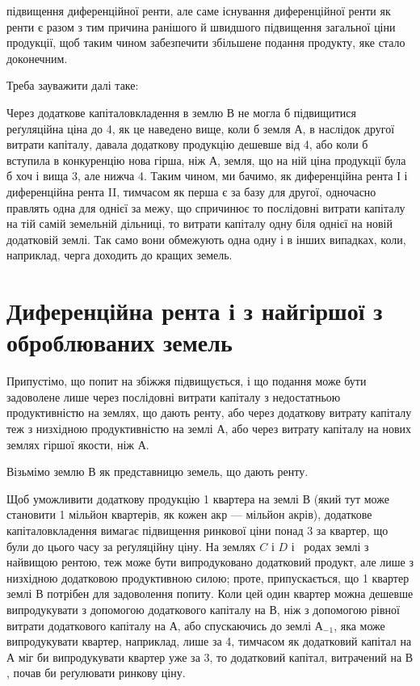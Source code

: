 \parcont{}  %
підвищення диференційної ренти, але саме існування диференційної ренти як
ренти є разом з тим причина ранішого й швидшого підвищення загальної ціни
продукції, щоб таким чином забезпечити збільшене подання продукту, яке стало доконечним.

Треба зауважити далі таке:

Через додаткове капіталовкладення в землю $В$ не могла б підвищитися
реґуляційна ціна до 4, як це наведено вище, коли б земля $А$, в наслідок
другої витрати капіталу, давала додаткову продукцію дешевше від 4, або коли б вступила в конкуренцію нова гірша, ніж $А$, земля, що на
ній ціна продукції була б хоч і вища 3, але нижча 4. Таким чином,
ми бачимо, як диференційна рента І і диференційна рента II, тимчасом як
перша є за базу для другої, одночасно правлять одна для однієї за межу, що
спричинює то послідовні витрати капіталу на тій самій земельній дільниці, то
витрати капіталу одну біля однієї на новій додатковій землі. Так само вони
обмежують одна одну і в інших випадках, коли, наприклад, черга доходить до
кращих земель.

\section{Диференційна рента і з найгіршої з оброблюваних земель}

Припустімо, що попит на збіжжя підвищується, і що подання може бути
задоволене лише через послідовні витрати капіталу з недостатньою продуктивністю
на землях, що дають ренту, або через додаткову витрату капіталу
теж з низхідною продуктивністю на землі $А$, або через витрату капіталу на
нових землях гіршої якости, ніж $А$.

Візьмімо землю $В$ як представницю земель, що дають ренту.

Щоб уможливити додаткову продукцію 1 квартера на землі $В$ (який
тут може становити 1 мільйон квартерів, як кожен акр — мільйон акрів), додаткове
капіталовкладення вимагає підвищення ринкової ціни понад 3
за квартер, що були до цього часу за реґуляційну ціну. На землях $C$ і $D$ і~ родах землі з найвищою рентою, теж може бути випродуковано додатковий
продукт, але лише з низхідною додатковою продуктивною силою; проте,
припускається, що 1 квартер землі $В$ потрібен для задоволення попиту.
Коли цей один квартер можна дешевше випродукувати з допомогою додаткового
капіталу на $В$, ніж з допомогою рівної витрати додаткового капіталу
на $А$, або спускаючись до землі $А_{-1}$, яка може випродукувати квартер, наприклад,
лише за 4, тимчасом як додатковий капітал на $А$ міг би випродукувати
квартер уже за 3, то додатковий капітал, витрачений на
$В$, почав би реґулювати ринкову ціну.

